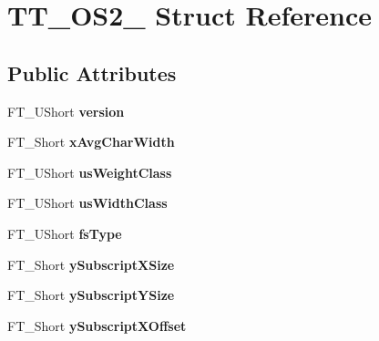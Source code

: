 \hypertarget{struct_t_t___o_s2__}{}\section{T\+T\+\_\+\+O\+S2\+\_\+ Struct Reference}
\label{struct_t_t___o_s2__}
\subsection*{Public Attributes}
\begin{DoxyCompactItemize}
\item 
\mbox{\label{struct_t_t___o_s2___a012ff79224cd25ae51837ca8937605c4}} 
F\+T\+\_\+\+U\+Short {\bfseries version}
\item 
\mbox{\label{struct_t_t___o_s2___af903883918479780d17a72f6fee992bd}} 
F\+T\+\_\+\+Short {\bfseries x\+Avg\+Char\+Width}
\item 
\mbox{\label{struct_t_t___o_s2___af4d8ab32a27382ea95b882d9e2615ec9}} 
F\+T\+\_\+\+U\+Short {\bfseries us\+Weight\+Class}
\item 
\mbox{\label{struct_t_t___o_s2___a8ef38b9f9c65a65aa6abf92e19236146}} 
F\+T\+\_\+\+U\+Short {\bfseries us\+Width\+Class}
\item 
\mbox{\label{struct_t_t___o_s2___ad7e436778424fe4dbe53ca8bd2a975c7}} 
F\+T\+\_\+\+U\+Short {\bfseries fs\+Type}
\item 
\mbox{\label{struct_t_t___o_s2___a3ae8d803a5055564e9f8a3926200e39c}} 
F\+T\+\_\+\+Short {\bfseries y\+Subscript\+X\+Size}
\item 
\mbox{\label{struct_t_t___o_s2___afb1b8ed1ea98badd4de58ff47b54c4c2}} 
F\+T\+\_\+\+Short {\bfseries y\+Subscript\+Y\+Size}
\item 
\mbox{\label{struct_t_t___o_s2___ab471c53b6e8a1c1f81cc410959bb5851}} 
F\+T\+\_\+\+Short {\bfseries y\+Subscript\+X\+Offset}
\item 
\mbox{\label{struct_t_t___o_s2___a94902b1f33ded0ea4c0555d54a0750fa}} 

\end{DoxyCompactItemize}
